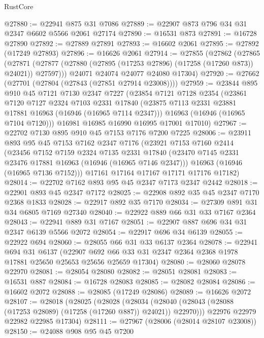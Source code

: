 \begin{lexlean}{RustCore}
\begin{coremodule}
@27880 := @22941 @875 @31 @7086
@27889 := @22907 @873 @796 @34 @31 @2347 @6602 @5566 @2061 @27174
@27890 := @16531 @873
@27891 := @16728 @27890
@27892 := @27889 @27891
@27893 := @16602 @2061
@27895 := @27892 (@17249 @27893)
@27896 := @16626 @2061
@27914 := @27855
    (@27862
      (@27865
        (@27871 (@27877 (@27880 (@27895 (@17253 @27896) (@17258 (@17260 @873)) @24021)) @27597)))
      @24071
      @24074
      @24077
      @24080
      @17304)
@27920 := @27662 (@27701 (@27804 (@27843 (@27851 @27914 @23008))))
@27959 := @23844
    @895
    @910
    @45
    @7121
    @7130
    @2347
    @7227
    (@23854
      @7121
      @7128
      @2354
      (@23861
        @7120
        @7127
        @2324
        @7103
        @2331
        @17840
        (@23875 @7113 @2331 @23881 @17881 @16963 (@16946 (@16965 @7114 @2347)))
        @16963
        (@16946 (@16965 @7104 @7120)))
      @16981
      @16985
      @16990
      @16995
      @17001
      @17010)
@27967 := @22702 @7130 @895 @910 @45 @7153 @7176 @7200 @7225
@28006 := @23911
    @893
    @95
    @45
    @7153
    @7162
    @2347
    @7176
    (@23921
      @7153
      @7160
      @2414
      (@23456
        @7152
        @7159
        @2324
        @7135
        @2331
        @17840
        (@23470 @7145 @2331 @23476 @17881 @16963 (@16946 (@16965 @7146 @2347)))
        @16963
        (@16946 (@16965 @7136 @7152)))
      @17161
      @17164
      @17167
      @17171
      @17176
      @17182)
@28014 := @22702 @7162 @893 @95 @45 @2347 @7173 @2347 @2442
@28018 := @22901 @893 @45 @2347 @7172
@28025 := @22908 @892 @35 @45 @2347 @7170 @2368 @1833
@28028 := @22917 @892 @35 @7170
@28034 := @27309 @891 @31 @34 @6805 @7169 @27340
@28040 := @22922 @889 @66 @31 @33 @7167 @2364
@28043 := @22941 @889 @31 @7167
@28051 := @22907 @887 @696 @34 @31 @2347 @6139 @5566 @2072
@28054 := @22917 @696 @34 @6139
@28055 := @22922 @694
@28060 := @28055 @66 @31 @33 @6137 @2364
@28078 := @22941
    @694
    @31
    @6137
    (@22907 @692 @66 @33 @31 @2347 @2364 @2368 @1978 @17881 @25650 @25653 @25656 @25659 @17304)
@28080 := @28060 @28078 @22970
@28081 := @28054 @28080
@28082 := @28051 @28081
@28083 := @16531 @887
@28084 := @16728 @28083
@28085 := @28082 @28084
@28086 := @16602 @2072
@28088 := @28085 (@17249 @28086)
@28089 := @16626 @2072
@28107 := @28018
    (@28025
      (@28028
        (@28034 (@28040 (@28043 (@28088 (@17253 @28089) (@17258 (@17260 @887)) @24021)) @22970)))
      @22976
      @22979
      @22982
      @22985
      @17304)
@28111 := @27967 (@28006 (@28014 @28107 @23008))
@28150 := @24088
    @908
    @95
    @45
    @7200

\end{coremodule}
\end{lexlean}
